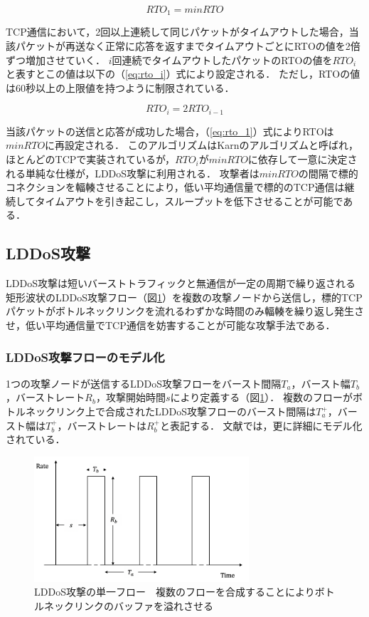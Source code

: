 \documentclass[Japanese]{dicomopapers}
\begin{document}
\begin{equation}
    \label{eq:rto_1}
    RTO_1 = minRTO
\end{equation}

TCP通信において，2回以上連続して同じパケットがタイムアウトした場合，当該パケットが再送なく正常に応答を返すまでタイムアウトごとにRTOの値を2倍ずつ増加させていく．
$i$回連続でタイムアウトしたパケットのRTOの値を$RTO_i$と表すとこの値は以下の（\ref{eq:rto_i}）式により設定される．
ただし，RTOの値は60秒以上の上限値を持つように制限されている．

\begin{equation}
    \label{eq:rto_i}
    RTO_i = 2RTO_{i-1}
\end{equation}

当該パケットの送信と応答が成功した場合，（\ref{eq:rto_1}）式によりRTOは$minRTO$に再設定される．
このアルゴリズムはKarnのアルゴリズムと呼ばれ，ほとんどのTCPで実装されているが，$RTO_i$が$minRTO$に依存して一意に決定される単純な仕様が，LDDoS攻撃に利用される．
攻撃者は$minRTO$の間隔で標的コネクションを輻輳させることにより，低い平均通信量で標的のTCP通信は継続してタイムアウトを引き起こし，スループットを低下させることが可能である．

\subsection{LDDoS攻撃}
LDDoS攻撃は短いバーストトラフィックと無通信が一定の周期で繰り返される矩形波状のLDDoS攻撃フロー（図\ref{fig:LDoS-flow}）を複数の攻撃ノードから送信し，標的TCPパケットがボトルネックリンクを流れるわずかな時間のみ輻輳を繰り返し発生させ，低い平均通信量でTCP通信を妨害することが可能な攻撃手法である\cite{ldos}．

\subsubsection{LDDoS攻撃フローのモデル化}
1つの攻撃ノードが送信するLDDoS攻撃フローをバースト間隔$T_a$，バースト幅$T_b$，バーストレート$R_b$，攻撃開始時間$s$により定義する（図\ref{fig:LDoS-flow}）．
複数のフローがボトルネックリンク上で合成されたLDDoS攻撃フローのバースト間隔は$T_a^+$，バースト幅は$T_b^+$，バーストレートは$R_b^+$と表記する．
文献\cite{cpr1}では，更に詳細にモデル化されている．

\begin{figure}[tb]
    \begin{center}
        \includegraphics[clip,width=8.0cm]{images/LDoS-flow.png}
        \caption{LDDoS攻撃の単一フロー　複数のフローを合成することによりボトルネックリンクのバッファを溢れさせる}
        \label{fig:LDoS-flow}
    \end{center}
\end{figure}
\end{document}
